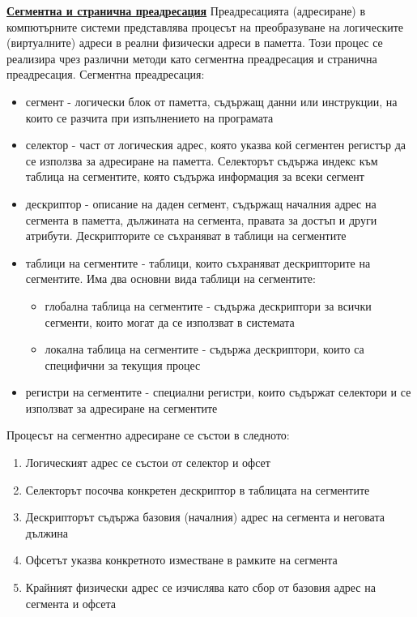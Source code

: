 \documentclass{article}
\begin{document}
\textbf{\underline{Сегментна и странична преадресация}} \newline\newline
Преадресацията (адресиране) в компютърните системи представлява процесът на преобразуване на логическите (виртуалните) адреси в реални
физически адреси в паметта. Този процес се реализира чрез различни методи като сегментна преадресация и странична преадресация. \newline\newline
Сегментна преадресация:
\begin{itemize}
    \item сегмент - логически блок от паметта, съдържащ данни или инструкции, на които се разчита при изпълнението на програмата
    \item селектор - част от логическия адрес, която указва кой сегментен регистър да се използва за адресиране на паметта. Селекторът
    съдържа индекс към таблица на сегментите, която съдържа информация за всеки сегмент
    \item дескриптор - описание на даден сегмент, съдържащ началния адрес на сегмента в паметта, дължината на сегмента, правата за достъп
    и други атрибути. Дескрипторите се съхраняват в таблици на сегментите
    \item таблици на сегментите - таблици, които съхраняват дескрипторите на сегментите. Има два основни вида таблици на сегментите:
    \begin{itemize}
        \item глобална таблица на сегментите - съдържа дескриптори за всички сегменти, които могат да се използват в системата
        \item локална таблица на сегментите - съдържа дескриптори, които са специфични за текущия процес
    \end{itemize}
    \item регистри на сегментите - специални регистри, които съдържат селектори и се използват за адресиране на сегментите
\end{itemize}
Процесът на сегментно адресиране се състои в следното:
\begin{enumerate}
    \item Логическият адрес се състои от селектор и офсет
    \item Селекторът посочва конкретен дескриптор в таблицата на сегментите
    \item Дескрипторът съдържа базовия (началния) адрес на сегмента и неговата дължина
    \item Офсетът указва конкретното изместване в рамките на сегмента
    \item Крайният физически адрес се изчислява като сбор от базовия адрес на сегмента и офсета
\end{enumerate}
\end{document}
